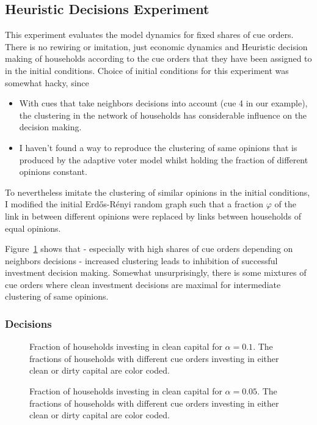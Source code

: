 \subsection{Heuristic Decisions Experiment}

This experiment evaluates the model dynamics for fixed shares of cue orders. There is no rewiring or imitation, just economic dynamics and Heuristic decision making of households according to the cue orders that they have been assigned to in the initial conditions.
Choice of initial conditions for this experiment was somewhat hacky, since 
\begin{itemize}
	\item With cues that take neighbors decisions into account (cue 4 in our example), the clustering in the network of households has considerable influence on the decision making.
	\item I haven't found a way to reproduce the clustering of same opinions that is produced by the adaptive voter model whilst holding the fraction of different opinions constant. 
\end{itemize}
To nevertheless imitate the clustering of similar opinions in the initial conditions, I modified the initial Erd\H{o}s-R\'enyi random graph such that a fraction $\varphi$ of the link in between different opinions were replaced by links between households of equal opinions. 
\par
Figure~\ref{5o3_1} shows that - especially with high shares of cue orders depending on neighbors decisions - increased clustering leads to inhibition of successful investment decision making. Somewhat unsurprisingly, there is some mixtures of cue orders where clean investment decisions are maximal for intermediate clustering of same opinions.
\subsubsection{Decisions}
\begin{figure}[t]
	\centering
	\caption{Fraction of households investing in clean capital for $\alpha=0.1$. The fractions of households with different cue orders investing in either clean or dirty capital are color coded.}
	\label{5o3_1}
\end{figure}
\begin{figure}[t]
	\centering
	\caption{Fraction of households investing in clean capital for $\alpha=0.05$. The fractions of households with different cue orders investing in either clean or dirty capital are color coded.}
	\label{5o3_2}
\end{figure} 
